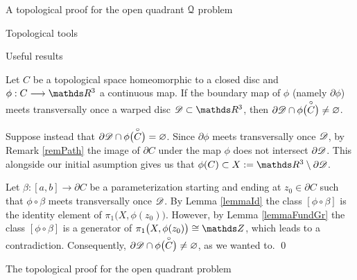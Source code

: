 \documentclass[11pt, a4paper, english, twoside, notitlepage, openright]{report}
\begin{document}
\begin{chapter}{A topological proof for the open quadrant $\mathcal{Q}$ problem}
\begin{section}{Topological tools}
\begin{subsection}{Useful results}
\begin{proposition}\label{propTop}
Let $C$ be a topological space homeomorphic to a closed disc and $\phi:C\longrightarrow\R^3$ a continuous map. If the boundary map of $\phi$ (namely $\partial\phi$) meets transversally once a warped disc $\D\subset\R^3$, then $\partial\mathscr{D}\cap\phi\big(\overset{\circ}{C}\big)\neq\varnothing$.
\begin{Proof}
Suppose instead that $\partial\mathscr{D}\cap\phi\big(\overset{\circ}{C}\big)=\varnothing$. Since $\partial\phi$ meets transversally once $\mathscr{D}$, by Remark \ref{remPath} the image of $\partial C$ under the map $\phi$ does not intersect $\partial\mathscr{D}$. This alongside our initial asumption gives us that $\phi(C)\subset X:=\R^3\setminus\partial\D$.

Let $\beta:[a,b]\to\partial C$ be a parameterization starting and ending at $z_0\in\partial C$ such that $\phi\circ\beta$ meets transversally once $\mathscr{D}$. By Lemma \ref{lemmaId} the class $[\phi\circ\beta]$ is the identity element of $\pi_1\big(X,\phi(z_0)\big)$. However, by Lemma \ref{lemmaFundGr} the class $[\phi\circ\beta]$ is a generator of $\pi_1\big(X,\phi(z_0)\big)\cong\Z$, which leads to a contradiction. Consequently, $\partial\mathscr{D}\cap\phi\big(\overset{\circ}{C}\big)\neq\varnothing$, as we wanted to.
\qed
\end{Proof}
\end{proposition}
\end{subsection}
\end{section}

\begin{section}{The topological proof for the open quadrant problem}


\end{section}
\end{chapter}
\end{document}
